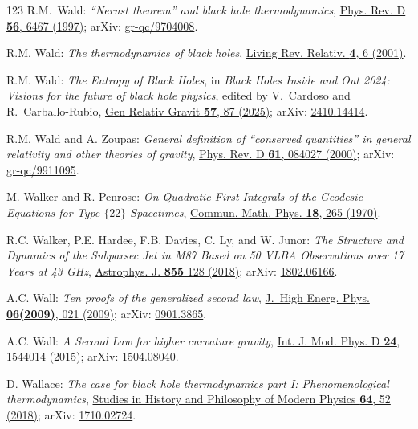 \begin{thebibliography}{123}
R.M.~Wald:
{\em ``Nernst theorem'' and black hole thermodynamics},
\href{https://doi.org/10.1103/PhysRevD.56.6467}{Phys. Rev. D {\bf 56}, 6467 (1997)};
arXiv: \href{https://arxiv.org/abs/gr-qc/9704008}{gr-qc/9704008}.

R.M. Wald: {\em The thermodynamics of black holes},
\href{https://doi.org/10.12942/lrr-2001-6}{Living Rev. Relativ. {\bf 4}, 6 (2001)}.

R.M. Wald: {\em The Entropy of Black Holes},
in {\em Black Holes Inside and Out 2024: Visions for the future of black hole physics},
edited by V.~Cardoso and R.~Carballo-Rubio,
\href{https://doi.org/10.1007/s10714-025-03417-x}{Gen Relativ Gravit {\bf 57}, 87 (2025)};
arXiv: \href{https://arxiv.org/abs/2410.14414}{2410.14414}.

R.M. Wald and A. Zoupas:
{\em General definition of ``conserved quantities'' in general relativity and other theories of gravity},
\href{https://doi.org/10.1103/PhysRevD.61.084027}{Phys. Rev. D {\bf 61}, 084027 (2000)};
arXiv: \href{https://arxiv.org/abs/gr-qc/9911095}{gr-qc/9911095}.

M. Walker and R. Penrose: {\em On Quadratic First Integrals of the Geodesic Equations
for Type $\{22\}$ Spacetimes},
\href{https://doi.org/10.1007/BF01649445}{Commun. Math. Phys. {\bf 18}, 265 (1970)}.

R.C. Walker, P.E. Hardee, F.B. Davies, C. Ly, and W. Junor:
{\em The Structure and Dynamics of the Subparsec Jet in M87 Based on 50 VLBA Observations over 17 Years at 43 GHz},
\href{https://doi.org/10.3847/1538-4357/aaafcc}{Astrophys. J. {\bf 855} 128 (2018)};
arXiv: \href{https://arxiv.org/abs/1802.06166}{1802.06166}.

A.C. Wall:
{\em Ten proofs of the generalized second law},
\href{https://doi.org/10.1088/1126-6708/2009/06/021}{J.~High Energ. Phys. {\bf 06(2009)}, 021 (2009)};
arXiv: \href{https://arxiv.org/abs/0901.3865}{0901.3865}.

A.C. Wall:
{\em A Second Law for higher curvature gravity},
\href{https://doi.org/10.1142/S0218271815440149}{Int. J. Mod. Phys. D {\bf 24}, 1544014 (2015)};
arXiv: \href{https://arxiv.org/abs/1504.08040}{1504.08040}.

D. Wallace:
{\em The case for black hole thermodynamics part I: Phenomenological thermodynamics},
\href{https://doi.org/10.1016/j.shpsb.2018.05.002}{Studies in History and Philosophy of Modern Physics {\bf 64}, 52 (2018)};
arXiv: \href{https://arxiv.org/abs/1710.02724}{1710.02724}.


\end{thebibliography}
